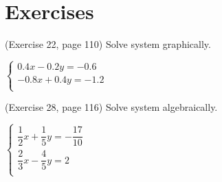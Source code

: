 \section{\large Exercises}


\begin{exer}(Exercise 22, page 110)
    Solve system graphically.
    \begin{center}
        $\begin{cases}
            0.4x - 0.2y = -0.6\\
            -0.8x + 0.4y = -1.2\\
        \end{cases}$
    \end{center}
\end{exer}

\begin{exer}(Exercise 28, page 116)
    Solve system algebraically.
    \begin{center}
        $\begin{cases}
            \dfrac{1}{2}x + \dfrac{1}{5}y =  -\dfrac{17}{10}\\[2mm]
            \dfrac{2}{3}x - \dfrac{4}{5}y = 2\\
        \end{cases}$
    \end{center}
\end{exer}


